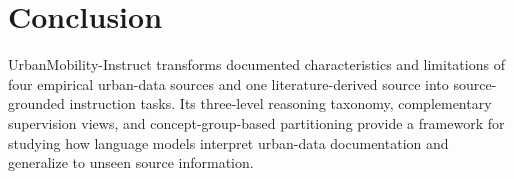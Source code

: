 \documentclass[a4paper,fleqn]{cas-sc}
\begin{document}




\section{Conclusion}
\label{sec:conclusion}

UrbanMobility-Instruct transforms documented characteristics and limitations of four empirical urban-data sources and one literature-derived source into source-grounded instruction tasks. Its three-level reasoning taxonomy, complementary supervision views, and concept-group-based partitioning provide a framework for studying how language models interpret urban-data documentation and generalize to unseen source information.
\end{document}
